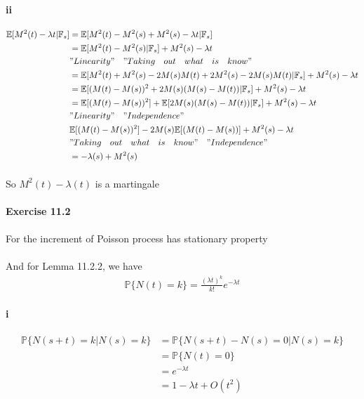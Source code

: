 \documentclass{article}
\begin{document}
\paragraph{ii}
\begin{align*}
  \mathbb{E}[M^2(t)-\lambda t|\mathbb{F}_s] &=\mathbb{E}[M^2(t)-M^2(s)+M^2(s)-\lambda t|\mathbb{F}_s]  \\
   & =\mathbb{E}[M^2(t)-M^2(s)|\mathbb{F}_s]+M^2(s)-\lambda t \\
   &"Linearity" \quad "Taking \quad out\quad  what\quad  is\quad  know"\\
 & =\mathbb{E}[M^2(t)+M^2(s)-2M(s)M(t)+2M^2(s)-2M(s)M(t)|\mathbb{F}_s]+M^2(s)-\lambda t\\
 &=\mathbb{E}[(M(t)-M(s))^2+2M(s)(M(s)-M(t))|\mathbb{F}_s]+M^2(s)-\lambda t\\
 &=\mathbb{E}[(M(t)-M(s))^2]+\mathbb{E}[2M(s)(M(s)-M(t))|\mathbb{F}_s]+M^2(s)-\lambda t\\
 &"Linearity" \quad "Independence"\\
 &\mathbb{E}[(M(t)-M(s))^2]-2M(s)\mathbb{E}[(M(t)-M(s))]+M^2(s)-\lambda t\\
 &"Taking \quad out\quad  what\quad  is\quad  know"\quad "Independence"\\
 &=-\lambda(s)+M^2(s)\\
\end{align*}
\paragraph{}{So $M^2(t)-\lambda(t)$ is a martingale}
\clearpage
\paragraph{Exercise 11.2}
\paragraph{}{For the increment of Poisson process has stationary property}
\paragraph{}{And for Lemma 11.2.2, we have}
\begin{align*}
  \mathbb{P}\{N(t)=k\}=\frac{(\lambda t)^k}{k!}e^{-\lambda t}
\end{align*}
\paragraph{i}
\begin{align*}
  \mathbb{P}\{N(s+t)=k|N(s)=k\} & =\mathbb{P}\{N(s+t)-N(s)=0|N(s)=k\} \\
   & =\mathbb{P}\{N(t)=0\}\\
   &=e^{-\lambda t}\\
   &=1-\lambda t+ O(t^2)
\end{align*}
\end{document}
